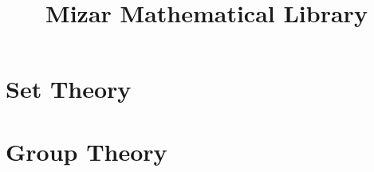 \documentclass{amsbook}
\title{Mizar Mathematical Library}
\begin{document}
\frontmatter
\maketitle
\tableofcontents

\mainmatter
\chapter{Set Theory}







\chapter{Group Theory}

\end{document}
